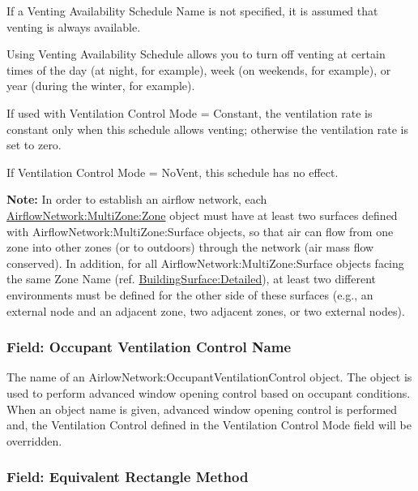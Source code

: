 If a Venting Availability Schedule Name is not specified, it is assumed that venting is always available.

Using Venting Availability Schedule allows you to turn off venting at certain times of the day (at night, for example), week (on weekends, for example), or year (during the winter, for example).

If used with Ventilation Control Mode = Constant, the ventilation rate is constant only when this schedule allows venting; otherwise the ventilation rate is set to zero.

If Ventilation Control Mode = NoVent, this schedule has no effect.

\textbf{Note:} In order to establish an airflow network, each \hyperref[airflownetworkmultizonezone]{AirflowNetwork:MultiZone:Zone} object must have at least two surfaces defined with AirflowNetwork:MultiZone:Surface objects, so that air can flow from one zone into other zones (or to outdoors) through the network (air mass flow conserved). In addition, for all AirflowNetwork:MultiZone:Surface objects facing the same Zone Name (ref. \hyperref[buildingsurfacedetailed]{BuildingSurface:Detailed}), at least two different environments must be defined for the other side of these surfaces (e.g., an external node and an adjacent zone, two adjacent zones, or two external nodes).

\subsubsection{Field: Occupant Ventilation Control Name}\label{field-occupant-ventilation-control-name-1}

The name of an AirlowNetwork:OccupantVentilationControl object. The object is used to perform advanced window opening control based on occupant conditions. When an object name is given, advanced window opening control is performed and, the Ventilation Control defined in the Ventilation Control Mode field will be overridden.

\subsubsection{Field: Equivalent Rectangle Method }\label{equivalent-rectangle-method}

